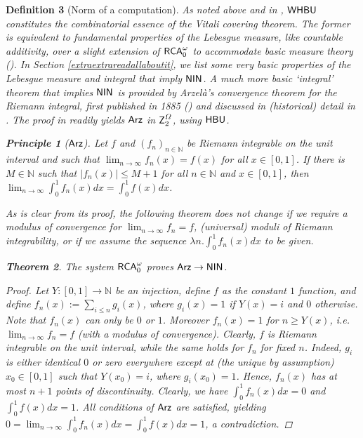\documentclass[reqno]{amsart}
\newtheorem{thm}{Theorem}
\newtheorem{defi}[thm]{Definition}
\newtheorem{princ}[thm]{Principle}
\def\Z{\textup{\textsf{Z}}}
\def\RCAo{\textup{\textsf{RCA}}_{0}^{\omega}}
\def\N{{\mathbb  N}}
\def\di{\rightarrow}
\def\HBU{\textup{\textsf{HBU}}}
\def\Arz{\textup{\textsf{Arz}}}
\def\NIN{\textup{\textsf{NIN}}}
\def\WHBU{\textup{\textsf{WHBU}}}
\numberwithin{equation}{section}
\numberwithin{thm}{section}
\begin{document}
\begin{defi}[Norm of a computation]
As noted above and in \cite{dagsamVI}, $\WHBU$ constitutes the combinatorial essence of the Vitali covering theorem.  The former is equivalent to fundamental properties of the Lebesgue measure, like countable additivity, 
over a slight extension of $\RCAo$ to accommodate basic measure theory (\cite{dagsamVI}).   In Section \ref{extraextrareadallaboutit},  we list some \emph{very} basic properties of the Lebesgue measure and integral that imply $\NIN$.  
A \emph{much} more basic `integral' theorem that implies $\NIN$ is provided by Arzel\`a's convergence theorem \emph{for the Riemann integral}, first published in 1885 (\cite{arse2}) and discussed in (historical) detail in \cites{luxeternam,kakeye}.  The proof in \cite{thomon3} readily yields $\Arz$ in $\Z_{2}^{\Omega}$, using $\HBU$.     
\begin{princ}[$\Arz$]
Let $f$ and $(f_{n})_{n\in \N}$ be Riemann integrable on the unit interval and such that $\lim_{n\di \infty}f_{n}(x)=f(x)$ for all $x\in [0,1]$.  
If there is $M\in \N$ such that $|f_{n}(x)|\leq M+1$ for all $n\in \N$ and $x\in [0,1]$, then $\lim_{n\di \infty}\int_{0}^{1}f_{n}(x)dx=\int_{0}^{1}f(x)dx$.
\end{princ}
As is clear from its proof, the following theorem does not change if we require a modulus of convergence for $\lim_{n\di \infty}f_{n}=f$, (universal) moduli of Riemann integrability, or if we assume the sequence $\lambda n.\int_{0}^{1}f_{n}(x)dx$ to be given.  
\begin{thm}\label{arzen}
The system $\RCAo$ proves $\Arz\di \NIN$.
\end{thm}
\begin{proof}
Let $Y:[0,1]\di \N$ be an injection, define $f$ as the constant $1$ function, and define $f_{n}(x):=\sum_{i\leq n}g_{i}(x)$, where $g_{i}(x)=1$ if $Y(x)=i$ and $0$ otherwise.  
Note that $f_{n}(x)$ can only be $0$ or $1$.  Moreover $f_{n}(x)=1$ for $n\geq Y(x)$, i.e.\ $\lim_{n\di \infty}f_{n}=f$ (with a modulus of convergence).  
Clearly, $f$ is Riemann integrable on the unit interval, while the same holds for $f_{n}$ for fixed $n$.  Indeed, $g_{i}$ is either identical $0$ or zero everywhere except at (the unique by assumption) $x_{0}\in [0,1]$ such that $Y(x_{0})=i$, where $g_{i}(x_{0})=1$.  Hence, $f_{n}(x)$ has at most $n+1$ points of discontinuity.  Clearly, we have $\int_{0}^{1}f_{n}(x)dx=0$ and $\int_{0}^{1}f(x)dx =1$.
All conditions of $\Arz$ are satisfied, yielding $0=\lim_{n\di \infty}\int_{0}^{1}f_{n}(x)dx=\int_{0}^{1}f(x)dx=1$, a contradiction.  %

\end{proof}
\end{defi}
\end{document}
